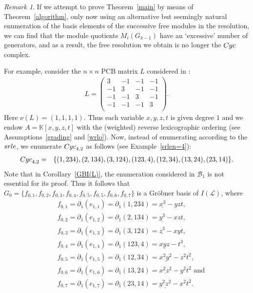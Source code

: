 \documentclass[10pt]{amsart}
\newcommand{\mbk}{\mbox{$\mathbb{K}$}}
\newcommand{\mcb}{\mbox{$\mathcal{B}$}}
\newcommand{\mcl}{\mbox{$\mathcal{L}$}}
\newcommand{\pcb}{\mbox{$\mathrm{PCB}$}}
\newcommand{\dif}{\mbox{$\partial$}}
\newcommand{\cyc}{\mbox{${\rm Cyc}$}}
\newcommand{\srle}{\mbox{${\rm srle}$}}
\theoremstyle{definition}
\theoremstyle{remark}
\newtheorem{remark}[cdrthm]{Remark}
\begin{document}
\begin{remark}\label{nonsrle}
If we attempt to prove Theorem~\ref{main} by means of
Theorem~\ref{algorithm}, only now using an alternative but seemingly
natural enumeration of the basis elements of the successive free
modules in the resolution, we can find that the module quotients
$M_{i}(G_{k-1})$ have an `excessive' number of generators, and as a
result, the free resolution we obtain is no longer the $\cyc$ complex.

For example, consider the $n\times n$ $\pcb$ matrix $L$ considered in
\cite[Example~1, 3]{ms}:
\begin{eqnarray*}
L=\left(\begin{array}{rrrr}
3&-1&-1&-1\\
-1&3&-1&-1\\
-1&-1&3&-1\\
-1&-1&-1&3\\
\end{array}\right).
\end{eqnarray*}
Here $\nu(L)=(1,1,1,1)$. Thus each variable $x,y,z,t$ is given degree
$1$ and we endow $A=\mbk[x,y,z,t]$ with the (weighted) reverse
lexicographic ordering (see Assumptions~\ref{grading} and
\ref{wrlo}). Now, instead of enumerating according to the $\srle$, we
enumerate $\cyc_{4,2}$ as follows (see Example~\ref{srlen=4}):
\begin{eqnarray*}
\cyc_{4,2}&=&\{(1,234),(2,134),(3,124),(123,4),(12,34),(13,24),(23,14)\}.
\end{eqnarray*}
Note that in Corollary~\ref{GBI(L)}, the enumeration considered in
$\mcb_1$ is not essential for its proof. Thus it follows that
$G_0=\{f_{0,1},f_{0,2},f_{0,3},f_{0,4},f_{0,5},f_{0,5},f_{0,6},f_{0,7}\}$
is a Gr\"obner basis of $I(\mcl)$, where
\begin{eqnarray*}
&&f_{0,1}=\dif_1(e_{1,1})=\dif_1(1,234)=\underline{x^3}-yzt,\\
&&f_{0,2}=\dif_1(e_{1,2})=\dif_1(2,134)=\underline{y^3}-xzt,\\
&&f_{0,3}=\dif_1(e_{1,3})=\dif_1(3,124)=\underline{z^3}-xyt,\\ 
&&f_{0,4}=\dif_1(e_{1,4})=\dif_1(123,4)=\underline{xyz}-t^3,\\
&&f_{0,5}=\dif_1(e_{1,5})=\dif_1(12,34)=\underline{x^2y^2}-z^2t^2,\\ 
&&f_{0,6}=\dif_1(e_{1,6})=\dif_1(13,24)=\underline{x^2z^2}-y^2t^2\mbox{ and }\\
&&f_{0,7}=\dif_1(e_{1,7})=\dif_1(23,14)=\underline{y^2z^2}-x^2t^2.
\end{eqnarray*}

\end{remark}
\end{document}
